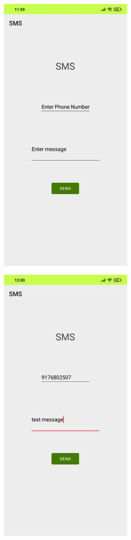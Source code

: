 \documentclass[12pt,letterpaper]{article}
\begin{document}
\subsection*{}
\begin{figure}[h]
    \centering
    \includegraphics[height=14cm, keepaspectratio]{Outputs/OP1.png}
\end{figure}
\begin{figure}
    \centering
    \includegraphics[height=14cm, keepaspectratio]{Outputs/OP2.png}
\end{figure}
\end{document}
